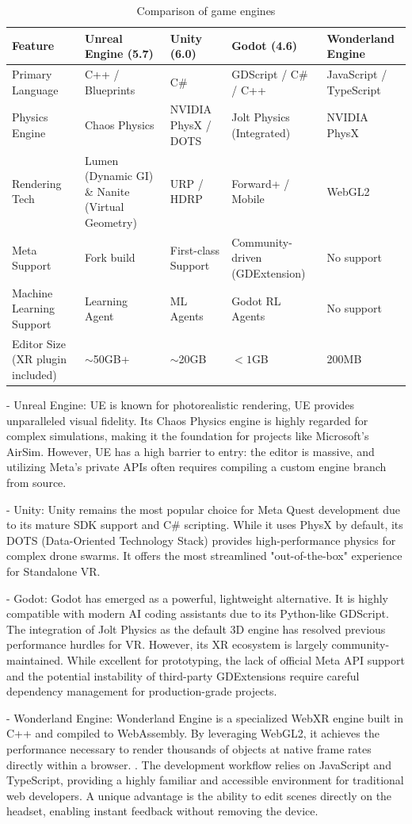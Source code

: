 \begin{table}[h]
\centering
\begin{tabular}{l|l|l|l|l}
\hline
Feature & Unreal Engine (5.7) & Unity (6.0) & Godot (4.6) & Wonderland Engine \\
\hline
Primary Language & C++ / Blueprints & C\# & GDScript / C\# / C++ & JavaScript / TypeScript \\
Physics Engine & Chaos Physics & NVIDIA PhysX / DOTS & Jolt Physics (Integrated) & NVIDIA PhysX \\
Rendering Tech & Lumen (Dynamic GI) \& Nanite (Virtual Geometry) & URP / HDRP & Forward+ / Mobile & WebGL2 \\
Meta Support & Fork build & First-class Support & Community-driven (GDExtension) & No support \\
Machine Learning Support & Learning Agent & ML Agents & Godot RL Agents & No support \\
Editor Size (XR plugin included) & $\sim$50GB+ & $\sim$20GB & $<1$GB & 200MB \\
\hline
\end{tabular}
\caption{Comparison of game engines}
\end{table}

- Unreal Engine: UE is known for photorealistic rendering, UE provides unparalleled visual fidelity. Its Chaos Physics engine is highly regarded for complex simulations, making it the foundation for projects like Microsoft’s AirSim. However, UE has a high barrier to entry: the editor is massive, and utilizing Meta’s private APIs often requires compiling a custom engine branch from source.

- Unity: Unity remains the most popular choice for Meta Quest development due to its mature SDK support and C\# scripting. While it uses PhysX by default, its DOTS (Data-Oriented Technology Stack) provides high-performance physics for complex drone swarms. It offers the most streamlined "out-of-the-box" experience for Standalone VR.

- Godot: Godot has emerged as a powerful, lightweight alternative. It is highly compatible with modern AI coding assistants due to its Python-like GDScript. The integration of Jolt Physics as the default 3D engine has resolved previous performance hurdles for VR. However, its XR ecosystem is largely community-maintained. While excellent for prototyping, the lack of official Meta API support and the potential instability of third-party GDExtensions require careful dependency management for production-grade projects.

- Wonderland Engine: Wonderland Engine is a specialized WebXR engine built in C++ and compiled to WebAssembly.  By leveraging WebGL2, it achieves the performance necessary to render thousands of objects at native frame rates directly within a browser. . The development workflow relies on JavaScript and TypeScript, providing a highly familiar and accessible environment for traditional web developers. A unique advantage is the ability to edit scenes directly on the headset, enabling instant feedback without removing the device.





